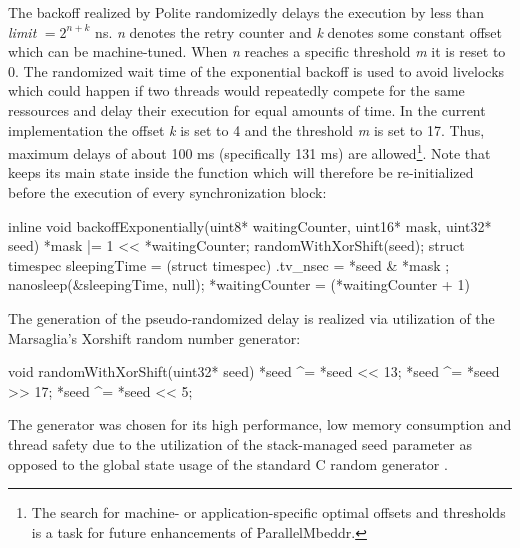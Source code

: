 The backoff realized by Polite randomizedly delays the execution  by less than \textit{limit} $ = 2^{n+k}$ ns\cite{AdvancedContentionManagement}. \textit{n} denotes the retry counter and \textit{k} denotes some constant offset which can be machine-tuned. When \textit{n} reaches a specific threshold \textit{m} it is reset to 0. The randomized wait time of the exponential backoff is used to avoid livelocks which could happen if two threads would repeatedly compete for the same ressources and delay their execution for equal amounts of time. In the current implementation  the offset \textit{k} is set to 4 and the threshold \textit{m} is set to 17. Thus, maximum delays of about 100 ms (specifically 131 ms) are allowed\footnote{The search for machine- or application-specific optimal offsets and thresholds is a task for future enhancements of ParallelMbeddr.}. Note that  keeps its main state inside the  function which will therefore be re-initialized before the execution of every synchronization block:
\begin{ccode}
inline void backoffExponentially(uint8* waitingCounter, uint16* mask, uint32* seed) { 
  *mask |= 1 << *waitingCounter; 
  randomWithXorShift(seed); 
  struct timespec sleepingTime = (struct timespec){ .tv_nsec = *seed & *mask }; 
  nanosleep(&sleepingTime, null); 
  *waitingCounter = (*waitingCounter + 1) %
}
\end{ccode}

The generation of the pseudo-randomized delay is realized via utilization of the Marsaglia's Xorshift random number generator\cite{XorshiftRngs}:
\begin{ccode}
void randomWithXorShift(uint32* seed) { 
  *seed ^= *seed << 13; 
  *seed ^= *seed >> 17; 
  *seed ^= *seed << 5; 
}
\end{ccode}
The generator was chosen for its high performance, low memory consumption and thread safety due to the utilization of the stack-managed seed parameter as opposed to the global state usage of the standard C random generator .

